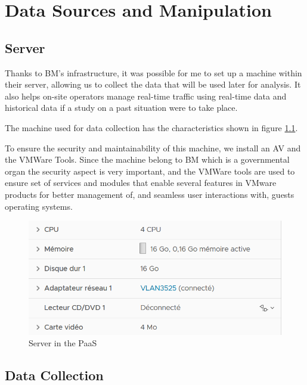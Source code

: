 \documentclass[12pt]{report}
\begin{document}
	 
	\chapter{Data Sources and Manipulation}
	
	\section{Server}
	
	Thanks to BM's infrastructure, it was possible for me to set up a machine within their server, allowing us to collect the data that will be used later for analysis. It also helps on-site operators manage real-time traffic using real-time data and historical data if a study on a past situation were to take place.
	
	The machine used for data collection has the characteristics shown in figure \ref{server}.
	
	To ensure the security and maintainability of this machine, we install an AV and the VMWare Tools. Since the machine belong to BM which is a governmental organ the security aspect is very important, and the VMWare tools are used to ensure set of services and modules that enable several features in VMware products for better management of, and seamless user interactions with, guests operating systems.
	
	
	
	
	\begin{figure}
		\begin{center}
			\includegraphics{images/CaracVM.png}
			\caption{Server in the PaaS}
			\label{server}
		\end{center}
	\end{figure}
	
	\section{Data Collection}
		
\end{document}
